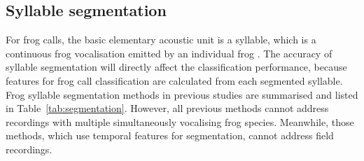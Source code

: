 \subsection{Syllable segmentation}
For frog calls, the basic elementary acoustic unit is a syllable, which is a continuous frog vocalisation emitted by an individual frog \citep{huang2009frog}. The accuracy of syllable segmentation will directly affect the classification performance, because features for frog call classification are calculated from each segmented syllable. Frog syllable segmentation methods in previous studies are summarised and listed in Table~\ref{tab:segmentation}. However, all previous methods cannot address recordings with multiple simultaneously vocalising frog species. Meanwhile, those methods, which use temporal features for segmentation, cannot address field recordings. 


  
\begin{table}[htb!]
\centering
\caption[Summary of related work]{Summary of prior work for frog syllable segmentation. Here, \textit{E} denotes energy, \textit{ZCR} denotes zero-crossing rate. Sequential denotes that syllables are segmented using the same sequence as those syllables in the recording}
\label{tab:segmentation}
\end{table}




